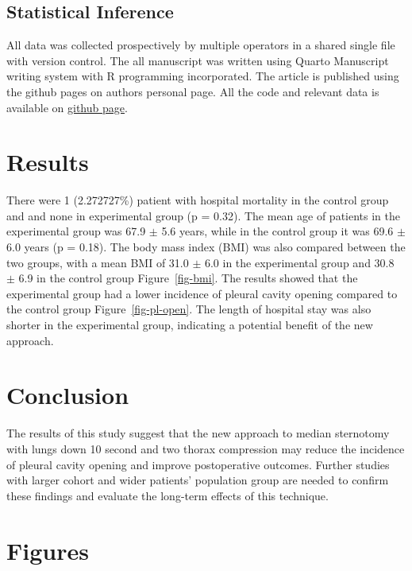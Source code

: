 \documentclass[
  number]{elsarticle}
\begin{document}
\subsection{Statistical Inference}\label{statistical-inference}

All data was collected prospectively by multiple operators in a shared
single file with version control. The all manuscript was written using
Quarto Manuscript writing system with R programming incorporated. The
article is published using the github pages on authors personal page.
All the code and relevant data is available on
\href{https://github.com/raffdoc/manuscript-template}{github page}.

\section{Results}\label{results}

There were 1 (2.272727\%) patient with hospital mortality in the control
group and and none in experimental group (p = 0.32). The mean age of
patients in the experimental group was 67.9 \(\pm\) 5.6 years, while in
the control group it was 69.6 \(\pm\) 6.0 years (p = 0.18). The body
mass index (BMI) was also compared between the two groups, with a mean
BMI of 31.0 \(\pm\) 6.0 in the experimental group and 30.8 \(\pm\) 6.9
in the control group Figure~\ref{fig-bmi}. The results showed that the
experimental group had a lower incidence of pleural cavity opening
compared to the control group Figure~\ref{fig-pl-open}. The length of
hospital stay was also shorter in the experimental group, indicating a
potential benefit of the new approach.

\section{Conclusion}\label{conclusion}

The results of this study suggest that the new approach to median
sternotomy with lungs down 10 second and two thorax compression may
reduce the incidence of pleural cavity opening and improve postoperative
outcomes. Further studies with larger cohort and wider patients'
population group are needed to confirm these findings and evaluate the
long-term effects of this technique.

\section{Figures}\label{figures}
\end{document}

